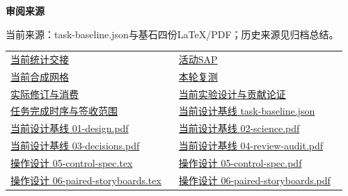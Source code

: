 \documentclass[11pt,a4paper]{article}
\newcommand{\reviewsubsection}[1]{\par\Needspace{4\baselineskip}\vspace{4pt}\begin{center}{\titlelatin\titlecjk\bfseries\fontsize{12}{18}\selectfont #1}\end{center}}
\begin{document}
\begin{minipage}{\linewidth}
\reviewsubsection{3.4 审阅来源}
当前来源：task-\allowbreak{}baseline.json与基石四份LaTeX/\allowbreak{}PDF；历史来源见归档总结。


\begingroup\small\setlength{\tabcolsep}{4pt}\begin{tabular}{@{}p{0.48\linewidth}p{0.48\linewidth}@{}}
\href{file:///D:/Agent/srp/agent/tasks/U12-04/outputs/current-statistics.md}{当前统计交接} & \href{file:///D:/Agent/srp/agent/tasks/U12-04/outputs/sap.md}{活动SAP}\\[4pt]
\href{file:///D:/Agent/srp/agent/tasks/U12-04/outputs/power/power_report.md}{当前合成网格} & \href{file:///D:/Agent/srp/agent/tasks/U12-04/evidence/verification.json}{本轮复测}\\[4pt]
\href{file:///D:/Agent/srp/agent/tasks/U12-04/evidence/consumer-impact.md}{实际修订与消费} & \href{file:///D:/Agent/srp/agent/design/\%E7\%A0\%94\%E7\%A9\%B6\%E4\%B8\%BB\%E6\%97\%A8\%E4\%B8\%8E\%E5\%AE\%9E\%E9\%AA\%8C\%E8\%AE\%BE\%E8\%AE\%A1\%E8\%AE\%BA\%E8\%AF\%81_\%E5\%BD\%93\%E5\%89\%8D.md}{当前实验设计与贡献论证}\\[4pt]
\href{file:///D:/Agent/srp/agent/work/2026-10-08_\%E4\%BB\%BB\%E5\%8A\%A1\%E5\%AE\%8C\%E6\%88\%90\%E6\%97\%B6\%E5\%BA\%8F\%E4\%B8\%8E\%E7\%A0\%94\%E7\%A9\%B6\%E4\%B8\%BB\%E6\%97\%A8.md}{任务完成时序与签收范围} & \href{file:///D:/Agent/srp/agent/design/design-foundation-20261008/task-baseline.json}{当前设计基线 task-\allowbreak{}baseline.json}\\[4pt]
\href{file:///D:/Agent/srp/agent/design/design-foundation-20261008/01-design.pdf}{当前设计基线 01-\allowbreak{}design.pdf} & \href{file:///D:/Agent/srp/agent/design/design-foundation-20261008/02-science.pdf}{当前设计基线 02-\allowbreak{}science.pdf}\\[4pt]
\href{file:///D:/Agent/srp/agent/design/design-foundation-20261008/03-decisions.pdf}{当前设计基线 03-\allowbreak{}decisions.pdf} & \href{file:///D:/Agent/srp/agent/design/design-foundation-20261008/04-review-audit.pdf}{当前设计基线 04-\allowbreak{}review-\allowbreak{}audit.pdf}\\[4pt]
\href{file:///D:/Agent/srp/agent/design/design-foundation-20261008/05-control-spec.tex}{操作设计 05-\allowbreak{}control-\allowbreak{}spec.tex} & \href{file:///D:/Agent/srp/agent/design/design-foundation-20261008/05-control-spec.pdf}{操作设计 05-\allowbreak{}control-\allowbreak{}spec.pdf}\\[4pt]
\href{file:///D:/Agent/srp/agent/design/design-foundation-20261008/06-paired-storyboards.tex}{操作设计 06-\allowbreak{}paired-\allowbreak{}storyboards.tex} & \href{file:///D:/Agent/srp/agent/design/design-foundation-20261008/06-paired-storyboards.pdf}{操作设计 06-\allowbreak{}paired-\allowbreak{}storyboards.pdf}\\[4pt]

\end{tabular}
\end{minipage}
\end{document}
